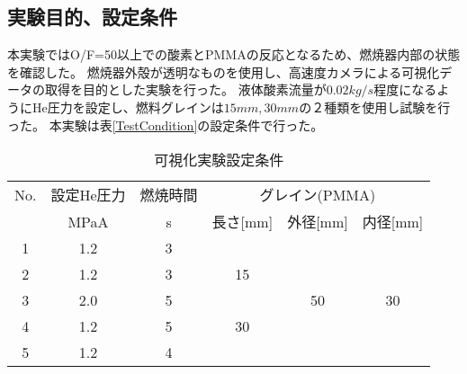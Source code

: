 \subsection{実験目的、設定条件}
本実験ではO/F=50以上での酸素とPMMAの反応となるため、燃焼器内部の状態を確認した。
燃焼器外殻が透明なものを使用し、高速度カメラによる可視化データの取得を目的とした実験を行った。
液体酸素流量が$0.02kg/s$程度になるようにHe圧力を設定し、燃料グレインは$15mm,30mm$の２種類を使用し試験を行った。
本実験は表\ref{TestCondition}の設定条件で行った。
\begin{table}[htb]
\begin{center}
\caption{可視化実験設定条件}
\small
\begin{tabular}{|c|c|c|c|c|c|} \hline
No. & 設定He圧力 & 燃焼時間 & \multicolumn{3}{|c|}{グレイン(PMMA)} \\ \cline{2-6}
 & MPaA & s & 長さ[mm] & 外径[mm] & 内径[mm]  \\ \hline
1 & 1.2 & 3 & & & \\ \cline{1-3}
2 & 1.2 & 3 & 15 & & \\ \cline{1-3}
3 & 2.0 & 5 & & 50 & 30  \\ \cline{1-4}
4 & 1.2 & 5 &30  &  & \\ \cline{1-3}
5 & 1.2 & 4 &  &  &  \\ \hline
\end{tabular}
\label{tab:TestCondition}
\end{center}
\end{table}

